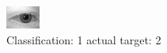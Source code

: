 \begin{figure}[h!]
\begin{center}
\includegraphics[width=0.60\columnwidth]{figures/ID478_class_1_target_2.png}
\end{center}
\caption{ Classification: 1 actual target: 2}
\label{fig:ID478_class_1_target_2}
\end{figure}
